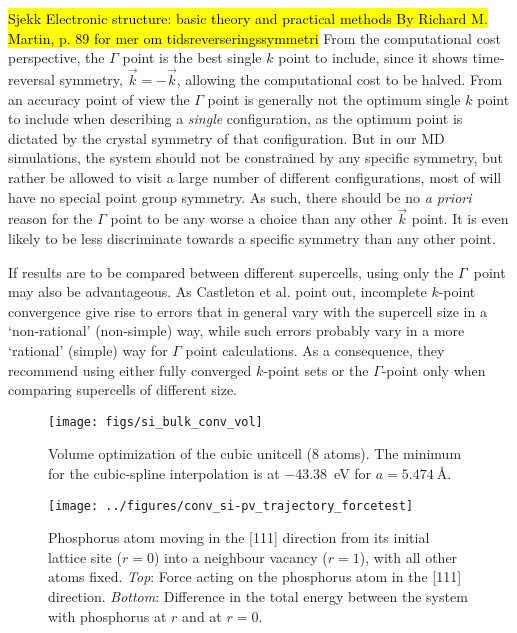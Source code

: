 \documentclass[11pt]{scrbook}   %
\newcommand{\comment}[1]{\hl{#1}}
\begin{document}
\comment{Sjekk 
Electronic structure: basic theory and practical methods By Richard M. Martin, p. 89 for mer om tidsreverseringssymmetri}
From the computational cost perspective, the $\Gamma$ point is the best single $k$ point to include, since it shows time-reversal symmetry, 
$\vec{k}=-\vec{k}$, allowing the computational cost to be halved. 
From an accuracy point of view the $\Gamma$ point is generally not the optimum single $k$ point to include when describing a \emph{single} configuration, as the optimum point is dictated by the crystal symmetry of that configuration\cite{Baldereschi:1973}. 
But in our MD simulations, the system should not be constrained by any specific symmetry, but rather be allowed to visit a large number of different configurations, most of will have no special point group symmetry. 
As such, there should be no \textit{a priori} reason for the $\Gamma$ point to be any worse a choice than any other $\vec{k}$ point. 
It is even likely to be less discriminate towards a specific symmetry than any other point.

If results are to be compared between different supercells, using only the $\Gamma$~point may also be advantageous.
As Castleton et al. point out\cite{Castleton:2009}, incomplete $k$-point convergence give rise to errors that in general vary with the supercell size in a `non-rational' (non-simple) way, while such errors probably vary in a more `rational' (simple) way for $\Gamma$ point calculations. 
As a consequence, they recommend using either fully converged $k$-point sets or the $\Gamma$-point only when comparing supercells of different size.


\begin{figure}[htbp]
  \begin{center}
    \texttt{[image: figs/si\_bulk\_conv\_vol]}
  \end{center}
  \caption{
     Volume optimization of the cubic unitcell (8 atoms). 
     The minimum for the cubic-spline interpolation is at
     \SI{-43.38}{\electronvolt} for $a=\SI{5.474}{\angstrom}$.
  }
  \label{fig:si_bulk_conv_vol}
\end{figure}



\begin{figure}[htbp]
  \begin{center}
    \texttt{[image: ../figures/conv\_si-pv\_trajectory\_forcetest]}
  \end{center}
  \caption{Phosphorus atom moving in the [111] direction from its initial lattice site ($r=0$) into a neighbour vacancy ($r=1$),
    with all other atoms fixed.
    \textit{Top}: Force acting on the phosphorus atom in the [111] direction. 
    \textit{Bottom}: Difference in the total energy between the system with phosphorus at $r$ and at $r=0$.
    }
  \label{fig:conv_si-pv_trajectory_forcetest}
\end{figure}
\end{document}
